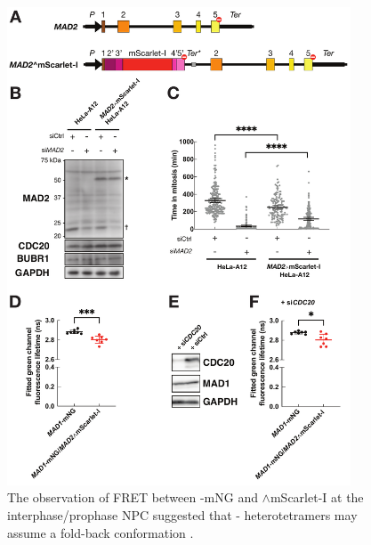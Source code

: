 \begin{figure}
    \centering
    \includegraphics[width=0.91\textwidth]{chapters/figures/InternallyTaggedMAD2+NPCFLIM.pdf}
    \caption{The observation of FRET between -mNG and $\wedge$mScarlet-I at the interphase/prophase NPC suggested that - heterotetramers may assume a fold-back conformation .}
    \label{InternallyTaggedMAD2+NPCFLIM}
\end{figure}
